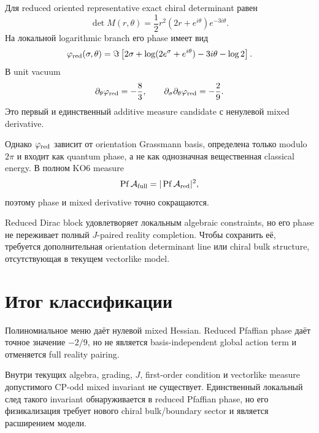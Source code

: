 Для reduced oriented representative exact chiral determinant равен
\begin{equation}
 \det M(r,\theta)
 =\frac12r^2(2r+e^{i\theta})e^{-3i\theta}.
\end{equation}
На локальной logarithmic branch его phase имеет вид
\begin{equation}
 \varphi_{\rm red}(\sigma,\theta)
 =\Im\left[
 2\sigma+\log(2e^\sigma+e^{i\theta})-3i\theta-\log2
 \right].
\end{equation}
В unit vacuum
\begin{equation}
 \partial_\theta\varphi_{\rm red}=-\frac83,
 \qquad
 \partial_\sigma\partial_\theta\varphi_{\rm red}=-\frac29.
\end{equation}
Это первый и единственный additive measure candidate с ненулевой mixed
derivative.

Однако $\varphi_{\rm red}$ зависит от orientation Grassmann basis, определена
только modulo $2\pi$ и входит как quantum phase, а не как однозначная
вещественная classical energy. В полном KO6 measure
\begin{equation}
 \operatorname{Pf}\mathcal A_{\rm full}
 =|\operatorname{Pf}\mathcal A_{\rm red}|^2,
\end{equation}
поэтому phase и mixed derivative точно сокращаются.

\begin{proposition}
Reduced Dirac block удовлетворяет локальным algebraic constraints, но его
phase не переживает полный $J$-paired reality completion. Чтобы сохранить
её, требуется дополнительная orientation determinant line или chiral bulk
structure, отсутствующая в текущем vectorlike model.
\end{proposition}

\section{Итог классификации}

Полиномиальное меню даёт нулевой mixed Hessian. Reduced Pfaffian phase даёт
точное значение $-2/9$, но не является basis-independent global action term
и отменяется full reality pairing.

\begin{theorem}
Внутри текущих algebra, grading, $J$, first-order condition и vectorlike
measure допустимого CP-odd mixed invariant не существует. Единственный
локальный след такого invariant обнаруживается в reduced Pfaffian phase, но
его физикализация требует нового chiral bulk/boundary sector и является
расширением модели.
\end{theorem}

